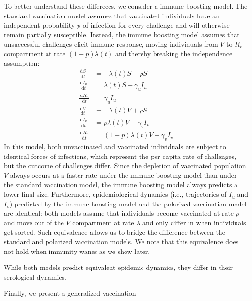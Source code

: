 \documentclass[12pt]{article}
\newcommand{\dd}[1]{\ensuremath{\, \mathrm{d}#1}}
\begin{document}
To better understand these differeces, we consider a immune boosting model.
The standard vaccination model assumes that vaccinated individuals have an independent probability $p$ of infection for every challenge and will otherwise remain partially susceptible.
Instead, the immune boosting model assumes that unsuccessful challenges elicit immune response, moving individuals from $V$ to $R_v$ compartment at rate $(1-p) \lambda(t)$ and thereby breaking the independence assumption: 
\begin{align}
\frac{\dd S}{\dd t} &= - \lambda(t) S - \rho S \\
\frac{\dd I_u}{\dd t} &= \lambda(t) S - \gamma_u I_u \\
\frac{\dd R_u}{\dd t} &= \gamma_u I_u \\
\frac{\dd V}{\dd t} &= - \lambda(t) V + \rho S \\
\frac{\dd I_v}{\dd t} &= p \lambda(t) V - \gamma_v I_v \\
\frac{\dd R_v}{\dd t} &= (1-p) \lambda(t) V + \gamma_v I_v
\end{align}
In this model, both unvaccinated and vaccinated individuals are subject to identical forces of infections, which represent the per capita rate of challenges, but the outcome of challenges differ.
Since the depletion of vaccinated population $V$ always occurs at a faster rate under the immune boosting model than under the standard vaccination model, the immune boosting model always predicts a lower final size.
Furthermore, epidemiological dynamics (i.e., trajectories of $I_u$ and $I_v$) predicted by the immune boosting model and the polarized vaccination model are identical: 
both models assume that individuals become vaccinated at rate $\rho$ and move out of the $V$ compartment at rate $\lambda$ and only differ in when individuals get sorted.
Such equivalence allows us to bridge the difference between the standard and polarized vaccination models.
We note that this equivalence does not hold when immunity wanes as we show later.

While both models predict equivalent epidemic dynamics, they differ in their serological dynamics.

Finally, we present a generalized vaccination 


 
\end{document}
